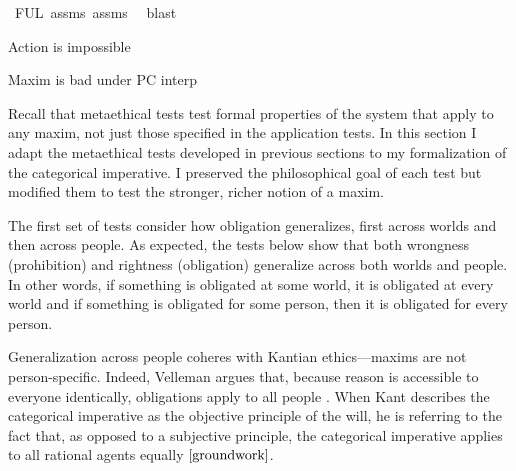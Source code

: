 \begin{isabellebody}
\isamarkupfalse%
\ FUL\ assms{\isacharparenleft}{}{\isacharparenright}\ assms{\isacharparenleft}{}{\isacharparenright}\ \isamarkupfalse%
\ blast%
\endisatagproof
{\isafoldproof}%
%
\isadelimproof
%
\endisadelimproof
%
\begin{isamarkuptext}%
Action is impossible%
\end{isamarkuptext}\isamarkuptrue%
%
\begin{isamarkuptext}%
Maxim is bad under PC interp%
\end{isamarkuptext}\isamarkuptrue%
%
\isadelimdocument
%
\endisadelimdocument
%
\isatagdocument
%
\isamarkuptrue%
%
\endisatagdocument
{\isafolddocument}%
%
\isadelimdocument
%
\endisadelimdocument
%
\begin{isamarkuptext}%
Recall that metaethical tests test formal properties of the system that apply to any maxim, not 
just those specified in the application tests. In this section I adapt the metaethical tests developed 
in previous sections to my formalization of the categorical imperative. I preserved the philosophical 
goal of each test but modified them to test the stronger, richer notion of a maxim.

The first set of tests consider how obligation generalizes, first across worlds and then across
people. As expected, the tests below show that both wrongness (prohibition) and rightness (obligation)
generalize across both worlds and people. In other words, if something is obligated at some world, it 
is obligated at every world and if something is obligated for some person, then it is obligated for 
every person. 

Generalization across people coheres with Kantian ethics—maxims are not person-specific.
Indeed, Velleman argues that, because reason is accessible to everyone identically, obligations apply 
to all people \cite[25]{velleman}. When Kant describes the categorical imperative as the objective 
principle of the will, he is referring to the fact that, as opposed to a subjective principle, the categorical
imperative applies to all rational agents equally $\cite[16]{groundwork}$. 


\end{isamarkuptext}
\end{isabellebody}
